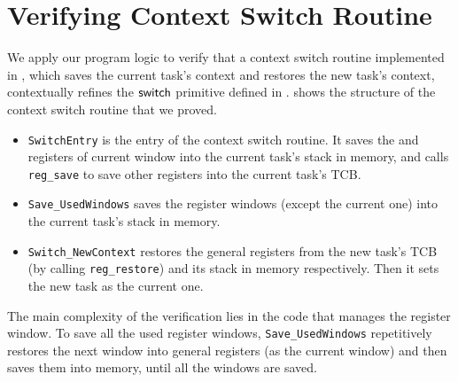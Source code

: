 \section{Verifying Context Switch Routine}
\label{sec:ctxswitch}

\indent
We apply our program logic to verify
that a context switch routine implemented in \sparc,
which saves the current task's context and
restores the new task's context,
contextually refines the $\mathsf{switch}{}$ primitive
defined in \Sec{\ref{subsec:High-level Pseudo-SPARCv8 Language}}.
\Fig{\ref{fig:The Structure of Context Switch Routine}}
shows the structure of the context switch routine that we proved.
\begin{center}
    
	\label{fig:The Structure of Context Switch Routine}
\end{center}
\begin{itemize}
    \item \texttt{SwitchEntry}
    is the entry of the context switch routine.
    It saves the \localRN{} and \inRN{} registers of current
    window into the current task's stack in memory, and calls
    \texttt{reg\_save} to save other registers into 
    the current task's TCB.

    \item
    \texttt{Save\_UsedWindows} saves
	the register windows (except the current one)
    into the current task's stack in memory.

    \item
    \texttt{Switch\_NewContext}
    restores the general registers from the new task's TCB
    (by calling \texttt{reg\_restore})
    and its stack in memory
    respectively. Then it sets the new task as
    the current one.
\end{itemize}

The main complexity of the verification lies in
the code that manages the register window.
To save all the used
register windows, \texttt{Save\_UsedWindows}
repetitively restores the next window into general registers
(as the current window)
and then saves them into memory, until all the windows are saved.

